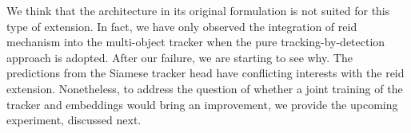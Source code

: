 We think that the architecture in its original formulation is not suited for this type of extension. In fact, we have only observed the integration of \gls{reid} mechanism into the multi-object tracker when the pure tracking-by-detection approach is adopted. After our failure, we are starting to see why. The predictions from the Siamese tracker head have conflicting interests with the \gls{reid} extension. Nonetheless, to address the question of whether a joint training of the tracker and embeddings would bring an improvement, we provide the upcoming experiment, discussed next.
